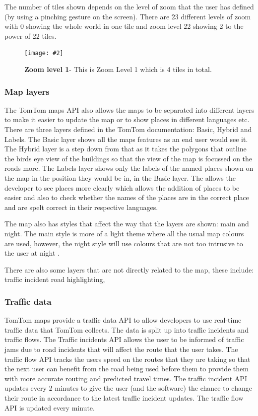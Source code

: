 \documentclass[12pt,a4paper]{article}
\newcommand{\figuremacro}[5]{
    \begin{figure}[#1]
        \centering
        \texttt{[image: \#2]}
        \caption[#3]{\textbf{#3}#4}
        \label{fig:#2}
    \end{figure}
}
\begin{document}
The number of tiles shown depends on the level of zoom that the user has defined (by using a pinching gesture on the screen). There are 23 different levels of zoom with 0 showing the whole world in one tile and zoom level 22 showing 2 to the power of 22 tiles. 

\figuremacro{h}{TomTomZoom1}{Zoom level 1}{- This is Zoom Level 1 which is 4 tiles in total.}{1.0} 

\subsubsection{Map layers}
The TomTom maps API also allows the maps to be separated into different layers to make it easier to update the map or to show places in different languages etc. There are three layers defined in the TomTom documentation: Basic, Hybrid and Labels. The Basic layer shows all the maps features as an end user would see it. The Hybrid layer is a step down from that as it takes the polygons that outline the birds eye view of the buildings so that the view of the map is focussed on the roads more. The Labels layer shows only the labels of the named places shown on the map in the position they would be in, in the Basic layer. The allows the developer to see places more clearly which allows the addition of places to be easier and also to check whether the names of the places are in the correct place and are spelt correct in their respective languages.

The map also has styles that affect the way that the layers are shown: main and night. The main style is more of a light theme where all the usual map colours are used, however, the night style will use colours that are not too intrusive to the user at night \cite{TomTomLayers}.

There are also some layers that are not directly related to the map, these include: traffic incident road highlighting,

\subsubsection{Traffic data}
TomTom maps provide a traffic data API to allow developers to use real-time traffic data that TomTom collects. The data is split up into traffic incidents and traffic flows. The Traffic incidents API allows the user to be informed of traffic jams due to road incidents that will affect the route that the user takes. The traffic flow API tracks the users speed on the routes that they are taking so that the next user can benefit from the road being used before them to provide them with more accurate routing and predicted travel times. The traffic incident API updates every 2 minutes to give the user (and the software) the chance to change their route in accordance to the latest traffic incident updates. The traffic flow API is updated every minute.
\end{document}
